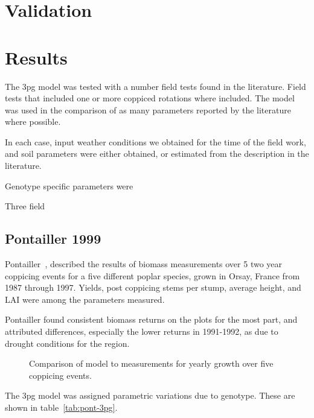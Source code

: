 \documentclass[10pt]{article}
\begin{document}
\section*{Validation}

\section*{Results}

The \ac{3pg} model was tested with a number field tests found in the
literature.  Field tests that included one or more coppiced rotations
where included.  The model was used in the comparison of as many
parameters reported by the literature where possible.  

In each case, input weather conditions we obtained for the time of the
field work, and soil parameters were either obtained, or estimated
from the description in the literature.  

Genotype specific parameters were

Three field
\subsection{Pontailler 1999}
\label{sec:pont}

Pontailler~\cite{Pontailler1999}, described the results of biomass
measurements over 5 two year coppicing events for a five different
poplar species, grown in Orsay, France from 1987 through 1997.
Yields, post coppicing stems per stump, average height, and \ac{LAI}
were among the parameters measured.

Pontailler found consistent biomass returns on the plots for the most
part, and attributed differences, especially the lower returns in
1991-1992, as due to drought conditions for the region.  


\begin{figure}[!ht]
  \centering
  
  \caption{Comparison of model to measurements for yearly growth over five
    coppicing events.}
\label{fig:pont-biomass}
\end{figure}


The \ac{3pg}
model was assigned parametric variations due to genotype.  These are
shown in table~\ref{tab:pont-3pg}.

\begin{table}[!ht]
  \centering
  \caption{\ac{3pg} parameter variations of \ac{3pg} among genotypes}
  \label{tab:pont-3pg}
\end{table}
\end{document}
